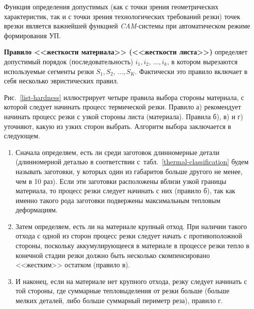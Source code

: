 \documentclass[11pt,twoside,openany]{report}
\begin{document}
Функция определения допустимых
(как с точки зрения геометрических характеристик,
так и с точки зрения технологических требований резки)
точек врезки является важнейшей функцией
{\it CAM}-системы
при автоматическом режиме формирования УП.

{\bf Правило <<жесткости материала>> (<<жесткости листа>>)}
определяет допустимый порядок
(последовательность)
$i_1, i_2, \,\dots, i_k$,
в котором вырезаются используемые сегменты резки
$S_1, S_2, \,\dots, S_K$.
Фактически это правило включает в себя несколько эвристических правил.

Рис.~\ref{list-hardness}
иллюстрирует четыре правила выбора стороны материала,
с которой следует начинать процесс термической резки.
Правило а) рекомендует начинать процесс резки с узкой стороны листа (материала).
Правила б), в) и г) уточняют,
какую из узких сторон выбрать.
Алгоритм выбора заключается в следующем.

\begin{enumerate}
  \item
  Сначала определяем,
  есть ли среди заготовок длинномерные детали
  (длинномерной деталью в соответствии с~табл.~\ref{thermal-classification}
  будем называть заготовки, у которых один из габаритов больше другого не менее,
  чем в 10 раз).
  Если эти заготовки расположены вблизи
  узкой границы материала,
  то процесс резки следует начинать с них
  (правило б),
  так как именно такого рода заготовки
  подвержены максимальным тепловым деформациям.
  \item
  Затем определяем,
  есть ли на материале крупный отход.
  При наличии такого отхода с одной из сторон
  процесс резки следует начать с противоположной стороны,
  поскольку аккумулирующееся в материале в процессе резки
  тепло в конечной стадии резки должно быть
  несколько скомпенсировано <<жестким>> остатком
  (правило в).
  \item
  И наконец,
  если на материале нет крупного отхода,
  резку следует начинать с той стороны,
  где суммарные тепловыделения от резки больше
  (больше мелких деталей, либо больше суммарный периметр реза),
  правило г.
\end{enumerate}
\end{document}
